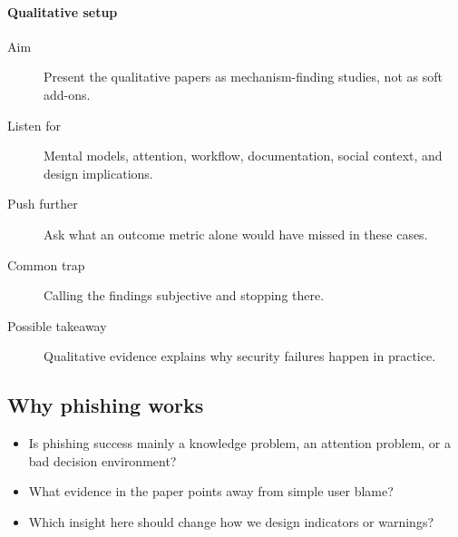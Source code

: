 \paragraph{Qualitative setup}
\begin{description}
  \item[Aim] Present the qualitative papers as mechanism-finding studies, not
    as soft add-ons.
  \item[Listen for] Mental models, attention, workflow, documentation, social
    context, and design implications.
  \item[Push further] Ask what an outcome metric alone would have missed in
    these cases.
  \item[Common trap] Calling the findings subjective and stopping there.
  \item[Possible takeaway] Qualitative evidence explains why security failures
    happen in practice.
\end{description}

\subsection{Why phishing works}

\begin{frame}
  \begin{question}
    \begin{itemize}
      \item Is phishing success mainly a knowledge problem, an attention
        problem, or a bad decision environment?
      \item What evidence in the paper points away from simple user blame?
      \item Which insight here should change how we design indicators or
        warnings?
    \end{itemize}
  \end{question}
\end{frame}

